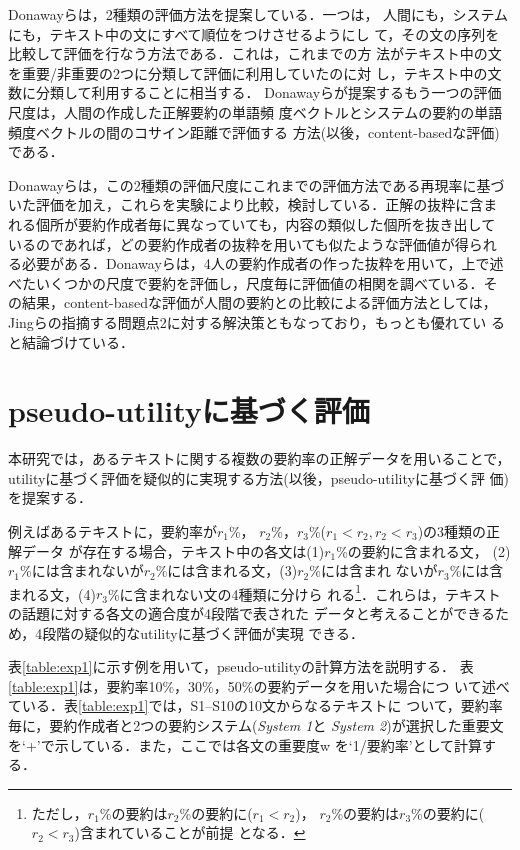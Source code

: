 Donawayら\cite{Donaway:2000}は，2種類の評価方法を提案している．一つは，
人間にも，システムにも，テキスト中の文にすべて順位をつけさせるようにし
て，その文の序列を比較して評価を行なう方法である．これは，これまでの方
法がテキスト中の文を重要/非重要の2つに分類して評価に利用していたのに対
し，テキスト中の文数に分類して利用することに相当する．
Donawayらが提案するもう一つの評価尺度は，人間の作成した正解要約の単語頻
度ベクトルとシステムの要約の単語頻度ベクトルの間のコサイン距離で評価する
方法(以後，content-basedな評価)である．

Donawayらは，この2種類の評価尺度にこれまでの評価方法である再現率に基づ
いた評価を加え，これらを実験により比較，検討している．正解の抜粋に含ま
れる個所が要約作成者毎に異なっていても，内容の類似した個所を抜き出して
いるのであれば，どの要約作成者の抜粋を用いても似たような評価値が得られ
る必要がある．Donawayらは，4人の要約作成者の作った抜粋を用いて，上で述
べたいくつかの尺度で要約を評価し，尺度毎に評価値の相関を調べている．そ
の結果，content-basedな評価が人間の要約との比較による評価方法としては，
Jingらの指摘する問題点2に対する解決策ともなっており，もっとも優れてい
ると結論づけている．


\section{pseudo-utilityに基づく評価}

本研究では，あるテキストに関する複数の要約率の正解データを用いることで，
utilityに基づく評価を疑似的に実現する方法(以後，pseudo-utilityに基づく評
価)を提案する．

例えばあるテキストに，要約率が$r_{1}$\%，
$r_{2}$\%，$r_{3}$\%($r_{1} < r_{2}, r_{2} < r_{3}$)の3種類の正解データ
が存在する場合，テキスト中の各文は(1)$r_{1}$\%の要約に含まれる文，
(2)$r_{1}$\%には含まれないが$r_{2}$\%には含まれる文，(3)$r_{2}$\%には含まれ
ないが$r_{3}$\%には含まれる文，(4)$r_{3}$\%に含まれない文の4種類に分けら
れる\footnote {ただし，$r_{1}$\%の要約は$r_{2}$\%の要約に($r_{1}<r_{2}$)，
$r_{2}$\%の要約は$r_{3}$\%の要約に($r_{2}<r_{3}$)含まれていることが前提
となる．}．これらは，テキストの話題に対する各文の適合度が4段階で表された
データと考えることができるため，4段階の疑似的なutilityに基づく評価が実現
できる．


表\ref{table:exp1}に示す例を用いて，pseudo-utilityの計算方法を説明する．
表\ref{table:exp1}は，要約率10\%，30\%，50\%の要約データを用いた場合につ
いて述べている．表\ref{table:exp1}では，S1--S10の10文からなるテキストに
ついて，要約率毎に，要約作成者と2つの要約システム({\it System 1}と{\it
System 2})が選択した重要文を`+'で示している．また，ここでは各文の重要度w
を`1/要約率'として計算する．

